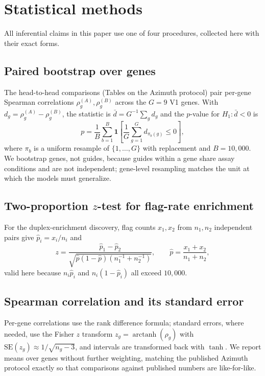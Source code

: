 \section{Statistical methods}
All inferential claims in this paper use one of four procedures, collected
here with their exact forms.

\subsection{Paired bootstrap over genes}
The head-to-head comparisons (Tables on the Azimuth protocol) pair
per-gene Spearman correlations $\rho_g^{(A)}, \rho_g^{(B)}$ across the
$G = 9$ V1 genes. With $d_g = \rho_g^{(A)} - \rho_g^{(B)}$, the statistic
is $\bar d = G^{-1}\sum_g d_g$ and the $p$-value for
$H_1: \bar d < 0$ is
\begin{equation}
p = \frac{1}{B}\sum_{b=1}^{B} \mathbf{1}\!\left[
\frac{1}{G}\sum_{g=1}^{G} d_{\pi_b(g)} \le 0 \right],
\end{equation}
where $\pi_b$ is a uniform resample of $\{1,\dots,G\}$ with replacement and
$B = 10{,}000$. We bootstrap genes, not guides, because guides within a
gene share assay conditions and are not independent; gene-level resampling
matches the unit at which the models must generalize.

\subsection{Two-proportion $z$-test for flag-rate enrichment}
For the duplex-enrichment discovery, flag counts $x_1, x_2$ from $n_1, n_2$
independent pairs give $\hat p_i = x_i / n_i$ and
\begin{equation}
z = \frac{\hat p_1 - \hat p_2}
{\sqrt{\hat p(1-\hat p)\left(n_1^{-1} + n_2^{-1}\right)}}, \qquad
\hat p = \frac{x_1 + x_2}{n_1 + n_2},
\end{equation}
valid here because $n_i \hat p_i$ and $n_i(1-\hat p_i)$ all exceed $10{,}000$.

\subsection{Spearman correlation and its standard error}
Per-gene correlations use the rank difference formula; standard errors, where
needed, use the Fisher $z$ transform
$z_g = \operatorname{arctanh}(\rho_g)$ with
$\mathrm{SE}(z_g) \approx 1/\sqrt{n_g - 3}$, and intervals are transformed
back with $\tanh$. We report means over genes without further weighting,
matching the published Azimuth protocol exactly so that comparisons against
published numbers are like-for-like.

